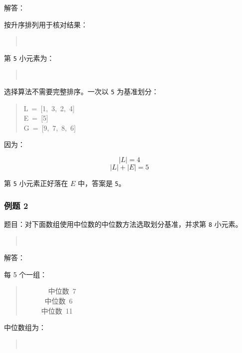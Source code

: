 \documentclass[UTF8,zihao=-4]{ctexart}
\begin{document}
解答：

按升序排列用于核对结果：

\begin{quote}
\small\ttfamily\raggedright
\relax [1,\ 2,\ 3,\ 4,\ 5,\ 6,\ 7,\ 8,\ 9]\\
\end{quote}

第 \texttt{5} 小元素为：

\begin{quote}
\small\ttfamily\raggedright
{}\\
\end{quote}

选择算法不需要完整排序。一次以 \texttt{5} 为基准划分：

\begin{quote}
\small\ttfamily\raggedright
\relax L\ =\ [1,\ 3,\ 2,\ 4]\\
\relax E\ =\ [5]\\
\relax G\ =\ [9,\ 7,\ 8,\ 6]\\
\end{quote}

因为：

\[|L| = 4\]
\[|L| + |E| = 5\]

第 \texttt{5} 小元素正好落在 $E$ 中，答案是 \texttt{5}。

\subsubsection*{例题 2}

题目：对下面数组使用中位数的中位数方法选取划分基准，并求第 \texttt{8} 小元素。

\begin{quote}
\small\ttfamily\raggedright
\relax [12,\ 5,\ 7,\ 1,\ 9,\ 3,\ 14,\ 6,\ 10,\ 2,\ 8,\ 15,\ 4,\ 13,\ 11]\\
\end{quote}

解答：

每 5 个一组：

\begin{quote}
\small\ttfamily\raggedright
\relax [12,\ 5,\ 7,\ 1,\ 9]\ \ \ \ \ \ \ 中位数\ 7\\
\relax [3,\ 14,\ 6,\ 10,\ 2]\ \ \ \ \ \ 中位数\ 6\\
\relax [8,\ 15,\ 4,\ 13,\ 11]\ \ \ \ \ 中位数\ 11\\
\end{quote}

中位数组为：

\begin{quote}
\small\ttfamily\raggedright
\relax [7,\ 6,\ 11]\\
\end{quote}
\end{document}
